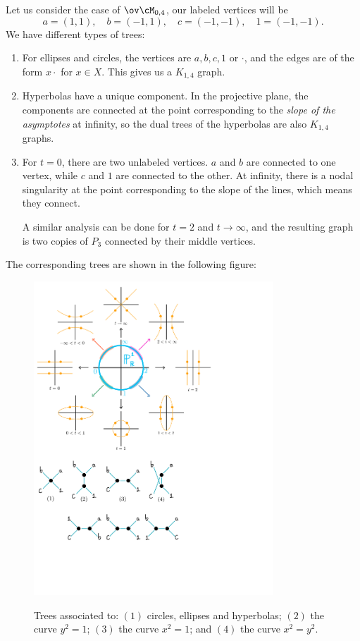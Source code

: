 \documentclass[12pt]{memoir}
\begin{document}
    \begin{Ex}
    Let us consider the case of $\ov\cM_{0,4}$, our labeled vertices will be 
    $$a=(1,1),\quad b=(-1,1),\quad c=(-1,-1),\quad 1=(-1,-1).$$
    We have different types of trees:
    \begin{enumerate}
        \itemsep=-0.4em
        \item For ellipses and circles, the vertices are ${a,b,c,1}$ or ${\cdot}$, and the edges are of the form $x\cdot$ for $x\in X$. This gives us a $K_{1,4}$ graph.
        \item Hyperbolas have a unique component. In the projective plane, the components are connected at the point corresponding to the \emph{slope of the asymptotes} at infinity, so the dual trees of the hyperbolas are also $K_{1,4}$ graphs.
        \item For $t=0$, there are two unlabeled vertices. $a$ and $b$ are connected to one vertex, while $c$ and $1$ are connected to the other. At infinity, there is a nodal singularity at the point corresponding to the slope of the lines, which means they connect.\par 
        A similar analysis can be done for $t=2$ and $t\to\infty$, and the resulting graph is two copies of $P_3$ connected by their middle vertices.
    \end{enumerate}
    The corresponding trees are shown in the following figure: 
    \begin{figure}[h!]
        \centering
        \includegraphics[width=0.8\textwidth, trim= 0.4cm 8.3cm 9cm 16cm,clip]{fig2.pdf}
        \label{fig3}
        \caption{Trees associated to: $(1)$ circles, ellipses and hyperbolas; $(2)$ the curve $y^2=1$; $(3)$ the curve $x^2=1$; and $(4)$ the curve $x^2=y^2$.}
    \end{figure}
    \end{Ex}
    
\end{document}
